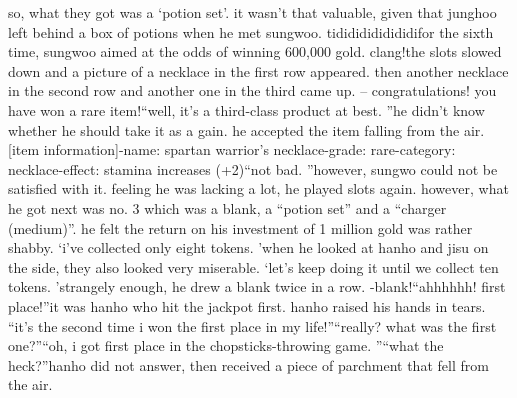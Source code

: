 so, what they got was a ‘potion set’.
 it wasn’t that valuable, given that junghoo left behind a box of potions when he met sungwoo.
tidididididididifor the sixth time, sungwoo aimed at the odds of winning 600,000 gold.
clang!the slots slowed down and a picture of a necklace in the first row appeared.
 then another necklace in the second row and another one in the third came up.
– congratulations! you have won a rare item!“well, it’s a third-class product at best.
”he didn’t know whether he should take it as a gain.
 he accepted the item falling from the air.
[item information]-name: spartan warrior’s necklace-grade: rare-category: necklace-effect: stamina increases (+2)“not bad.
”however, sungwo could not be satisfied with it.
 feeling he was lacking a lot, he played slots again.
however, what he got next was no.
 3 which was a blank, a “potion set” and a “charger (medium)”.
 he felt the return on his investment of 1 million gold was rather shabby.
‘i’ve collected only eight tokens.
’when he looked at hanho and jisu on the side, they also looked very miserable.
‘let’s keep doing it until we collect ten tokens.
’strangely enough, he drew a blank twice in a row.
-blank!“ahhhhhh! first place!”it was hanho who hit the jackpot first.
 hanho raised his hands in tears.
“it’s the second time i won the first place in my life!”“really? what was the first one?”“oh, i got first place in the chopsticks-throwing game.
”“what the heck?”hanho did not answer, then received a piece of parchment that fell from the air.

